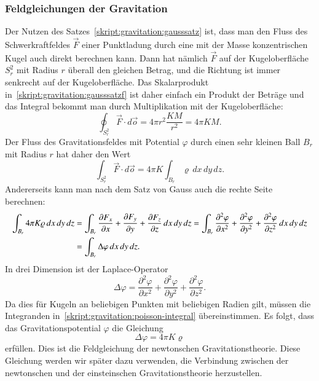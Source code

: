 \subsubsection{Feldgleichungen der Gravitation}
Der Nutzen des Satzes~\ref{skript:gravitation:gausssatz}
ist, dass man den Fluss des Schwerkraftfeldes
$\vec F$ einer Punktladung durch eine mit der Masse konzentrischen
Kugel auch direkt berechnen kann.
Dann hat nämlich $\vec F$ auf der Kugeloberfläche $S^2_r$ mit
Radius $r$ überall den gleichen
Betrag, und die Richtung ist immer senkrecht auf der Kugeloberfläche.
Das Skalarprodukt in~\eqref{skript:gravitation:gausssatzf} ist daher
einfach ein Produkt der Beträge und das Integral bekommt man durch
Multiplikation mit der Kugeloberfläche:
\[
\oint_{S^2_r} \vec F\cdot d\vec o
=
4\pi r^2
\frac{KM}{r^2}
=
4\pi KM.
\]
Der Fluss des Gravitationsfeldes mit Potential $\varphi$ durch einen
sehr kleinen Ball $B_r$ mit Radius $r$ hat daher den Wert
\[
\int_{S^2_r}\vec F\cdot d\vec o
=
4\pi K\int_{B_r} \varrho\,dx\,dy\,dz.
\]
Andererseits kann man nach dem Satz von Gauss auch die rechte 
Seite berechnen:
\begin{align}
\int_{B_r} 4\pi K\varrho\,dx\,dy\,dz
&=
\int_{B_r}
\frac{\partial F_x}{\partial x}+
\frac{\partial F_y}{\partial y}+
\frac{\partial F_z}{\partial z}
\,dx\,dy\,dz
=
\int_{B_r}
\frac{\partial^2\varphi}{\partial x^2}+
\frac{\partial^2\varphi}{\partial y^2}+
\frac{\partial^2\varphi}{\partial z^2}
\,dx\,dy\,dz
\notag
\\
&=
\int_{B_r} \Delta\varphi\,dx\,dy\,dz.
\label{skript:gravitation:poisson-integral}
\end{align}
In drei Dimension ist der Laplace-Operator
\[
\Delta \varphi
=
\frac{\partial^2 \varphi}{\partial x^2}
+
\frac{\partial^2 \varphi}{\partial y^2}
+
\frac{\partial^2 \varphi}{\partial z^2}.
\]
Da dies für Kugeln an beliebigen Punkten mit beliebigen Radien 
gilt, müssen die Integranden in~\eqref{skript:gravitation:poisson-integral}
übereinstimmen.
Es folgt, dass das Gravitationspotential $\varphi$ die Gleichung
\begin{equation}
\Delta \varphi = 4\pi K\varrho
\label{skript:gravitation:potentialgleichung}
\end{equation}
erfüllen.
Dies ist die Feldgleichung der newtonschen Gravitationstheorie.
Diese Gleichung werden wir später dazu verwenden, die Verbindung zwischen
der newtonschen und der einsteinschen Gravitationstheorie herzustellen.

